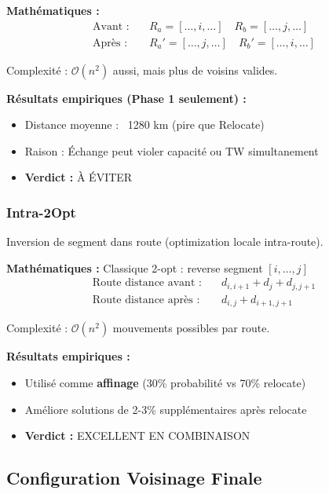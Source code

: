 \documentclass[12pt,a4paper,twoside]{report}
\begin{document}
\textbf{Mathématiques :}
\begin{align}
    \text{Avant :} & \quad R_a = [\ldots, i, \ldots] \quad R_b = [\ldots, j, \ldots]   \\
    \text{Après :} & \quad R_a' = [\ldots, j, \ldots] \quad R_b' = [\ldots, i, \ldots]
\end{align}

Complexité : $\mathcal{O}(n^2)$ aussi, mais plus de voisins valides.

\textbf{Résultats empiriques (Phase 1 seulement) :}
\begin{itemize}
    \item Distance moyenne : ~1280 km (pire que Relocate)
    \item Raison : Échange peut violer capacité ou TW simultanement
    \item \textbf{Verdict :} À ÉVITER
\end{itemize}

\subsubsection{Intra-2Opt}

Inversion de segment dans route (optimization locale intra-route).

\textbf{Mathématiques :} Classique 2-opt : reverse segment $[i, \ldots, j]$
\begin{align}
    \text{Route distance avant :} & \quad d_{i, i+1} + d_j + d_{j, j+1} \\
    \text{Route distance après :} & \quad d_{i,j} + d_{i+1, j+1}
\end{align}

Complexité : $\mathcal{O}(n^2)$ mouvements possibles par route.

\textbf{Résultats empiriques :}
\begin{itemize}
    \item Utilisé comme \textbf{affinage} (30\% probabilité vs 70\% relocate)
    \item Améliore solutions de 2-3\% supplémentaires après relocate
    \item \textbf{Verdict :} EXCELLENT EN COMBINAISON
\end{itemize}

\subsection{Configuration Voisinage Finale}
\end{document}
